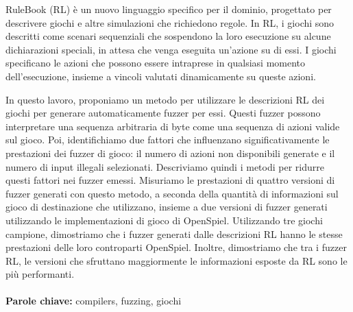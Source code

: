 \documentclass{Configuration_Files/PoliMi3i_thesis}
\begin{document}
RuleBook (RL) è un nuovo linguaggio specifico per il dominio, progettato per descrivere giochi e altre simulazioni che richiedono regole.
In RL, i giochi sono descritti come scenari sequenziali che sospendono la loro esecuzione su alcune dichiarazioni speciali, in attesa che venga eseguita un'azione su di essi.
I giochi specificano le azioni che possono essere intraprese in qualsiasi momento dell'esecuzione, insieme a vincoli valutati dinamicamente su queste azioni.

In questo lavoro, proponiamo un metodo per utilizzare le descrizioni RL dei giochi per generare automaticamente fuzzer per essi.
Questi fuzzer possono interpretare una sequenza arbitraria di byte come una sequenza di azioni valide sul gioco.
Poi, identifichiamo due fattori che influenzano significativamente le prestazioni dei fuzzer di gioco: il numero di azioni non disponibili generate e il numero di input illegali selezionati.
Descriviamo quindi i metodi per ridurre questi fattori nei fuzzer emessi.
Misuriamo le prestazioni di quattro versioni di fuzzer generati con questo metodo, a seconda della quantità di informazioni sul gioco di destinazione che utilizzano, insieme a due versioni di fuzzer generati utilizzando le implementazioni di gioco di OpenSpiel.
Utilizzando tre giochi campione, dimostriamo che i fuzzer generati dalle descrizioni RL hanno le stesse prestazioni delle loro controparti OpenSpiel.
Inoltre, dimostriamo che tra i fuzzer RL, le versioni che sfruttano maggiormente le informazioni esposte da RL sono le più performanti.
\\
\\
\textbf{Parole chiave:} compilers, fuzzing, giochi

\thispagestyle{empty}
\tableofcontents %
\thispagestyle{empty}
\cleardoublepage

%
%
%    
%
\end{document}

